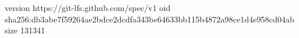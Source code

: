 version https://git-lfs.github.com/spec/v1
oid sha256:db3abe7f59264ae2bdce2dcdfa343be64633bb115b4872a98ce1d4e958cd04ab
size 131341
